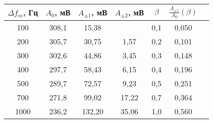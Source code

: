 \begin{tabular}{ccccccc}
\toprule
$\Delta f_m$, Гц & $A_0$, мВ & $A_{\pm1}$, мВ & $A_{\pm2}$, мВ & $\beta$ & $\frac{A_{\pm1}}{A_0}(\beta)$\\
\midrule
100  & 308,1 & 15,38  &       & 0,1 & 0,050 \\
200  & 305,7 & 30,75  & 1,57  & 0,2 & 0,101 \\
300  & 302,6 & 44,86  & 3,45  & 0,3 & 0,148 \\
400  & 297,7 & 58,43  & 6,15  & 0,4 & 0,196 \\
500  & 289,7 & 72,57  & 9,23  & 0,5 & 0,251 \\
700  & 271,8 & 99,02  & 17,22 & 0,7 & 0,364 \\
1000 & 236,2 & 132,20 & 35,06 & 1,0 & 0,560 \\
\bottomrule
\end{tabular}
